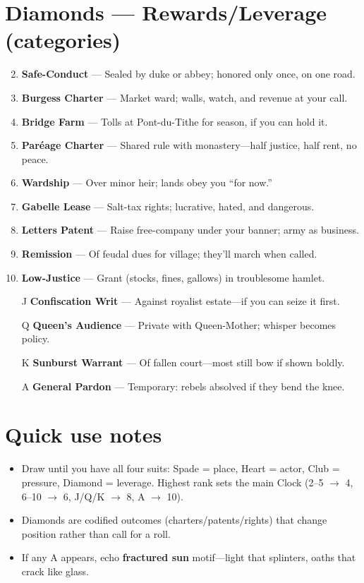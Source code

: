 \section*{Diamonds --- Rewards/Leverage (categories)}
\label{sec:vhasia-rewards}
\begin{enumerate}
\setcounter{enumi}{1}
\item \textbf{Safe-Conduct} --- Sealed by duke or abbey; honored only once, on one road.
\item \textbf{Burgess Charter} --- Market ward; walls, watch, and revenue at your call.
\item \textbf{Bridge Farm} --- Tolls at Pont-du-Tithe for season, if you can hold it.
\item \textbf{Paréage Charter} --- Shared rule with monastery—half justice, half rent, no peace.
\item \textbf{Wardship} --- Over minor heir; lands obey you ``for now.''
\item \textbf{Gabelle Lease} --- Salt-tax rights; lucrative, hated, and dangerous.
\item \textbf{Letters Patent} --- Raise free-company under your banner; army as business.
\item \textbf{Remission} --- Of feudal dues for village; they'll march when called.
\item \textbf{Low-Justice} --- Grant (stocks, fines, gallows) in troublesome hamlet.
\item[J] \textbf{Confiscation Writ} --- Against royalist estate—if you can seize it first.
\item[Q] \textbf{Queen's Audience} --- Private with Queen-Mother; whisper becomes policy.
\item[K] \textbf{Sunburst Warrant} --- Of fallen court—most still bow if shown boldly.
\item[A] \textbf{General Pardon} --- Temporary: rebels absolved if they bend the knee.
\end{enumerate}

\section*{Quick use notes}
\label{sec:vhasia-quick-use}
\begin{itemize}
\item Draw until you have all four suits: Spade = place, Heart = actor, Club = pressure, Diamond = leverage. Highest rank sets the main Clock (2--5 $\rightarrow$ 4, 6--10 $\rightarrow$ 6, J/Q/K $\rightarrow$ 8, A $\rightarrow$ 10).
\item Diamonds are codified outcomes (charters/patents/rights) that change position rather than call for a roll.
\item If any A appears, echo \textbf{fractured sun} motif—light that splinters, oaths that crack like glass.
\end{itemize}

